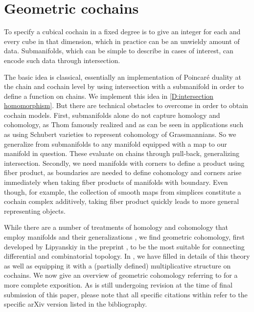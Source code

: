 
\section{Geometric cochains}\label{S:geometric cochains}

To specify a cubical cochain in a fixed degree is to give an integer for each and every cube in that dimension, which in practice can be an unwieldy amount of data.
Submanifolds, which can be simple to describe in cases of interest, can encode such data through intersection.

The basic idea is classical, essentially an implementation of Poincar\'e duality at the chain and cochain level by using intersection with a submanifold in order to define a function on chains.
We implement this idea in \cref{D:intersection homomorphism}.
But there are technical obstacles to overcome in order to obtain cochain models.
First, submanifolds alone do not capture homology and cohomology, as Thom famously realized and as can be seen in applications such as using Schubert varieties to represent cohomology of Grassmannians.
So we generalize from submanifolds to any manifold equipped with a map to our manifold in question.
These evaluate on chains through pull-back, generalizing intersection.
Secondly, we need manifolds with corners to define a product using fiber product, as boundaries are needed to define cohomology and corners arise immediately when taking fiber products of manifolds with boundary. Even though, for example, the collection of smooth maps from simplices constitute a cochain complex additively, taking fiber product quickly leads to more general representing objects.

While there are a number of treatments of homology and cohomology that employ manifolds and their generalizations \cite{Whit47, BRS76, FeSj83, Krec10, Kahn01, Zing08, Joyc15}, we find {geometric cohomology}, first developed by Lipyanskiy in the preprint \cite{Lipy14}, to be the most suitable for connecting differential and combinatorial topology.
In \cite{medina2022foundations}, we have filled in details of this theory as well as equipping it with a (partially defined) multiplicative structure on cochains.
We now give an overview of geometric cohomology referring to \cite{medina2022foundations} for a more complete exposition.
As \cite{medina2022foundations} is still undergoing revision at the time of final submission of this paper, please note that all specific citations within \cite{medina2022foundations} refer to the specific arXiv version listed in the bibliography.

